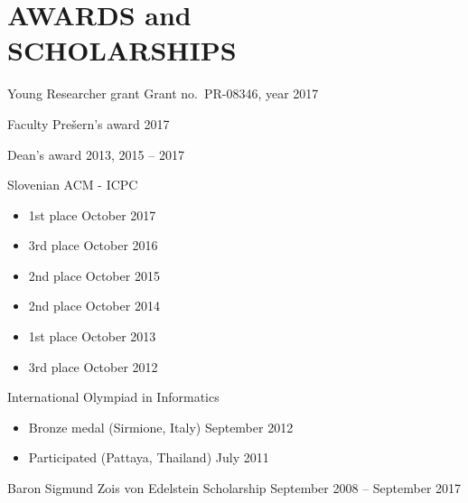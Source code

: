 \documentclass[line,margin]{res}
\newcommand{\wmeta}[1]{\sf#1\rm}
\begin{document}

\section{AWARDS and \\ SCHOLARSHIPS}

\wmeta{Young Researcher grant} \hfill Grant no.\ PR-08346, year 2017

\wmeta{Faculty Prešern's award} \hfill 2017

\wmeta{Dean's award} \hfill 2013, 2015 -- 2017

\wmeta{Slovenian ACM - ICPC}
\begin{itemize}
  \item 1st place \hfill October 2017
  \item 3rd place \hfill October 2016
  \item 2nd place \hfill October 2015
  \item 2nd place \hfill October 2014
  \item 1st place \hfill October 2013
  \item 3rd place \hfill October 2012
\end{itemize}

\wmeta{International Olympiad in Informatics}
\begin{itemize}
  \item Bronze medal (Sirmione, Italy) \hfill September 2012
  \item Participated (Pattaya, Thailand) \hfill July 2011
\end{itemize}

\wmeta{Baron Sigmund Zois von Edelstein Scholarship} \hfill September 2008 -- September 2017

\end{document}
